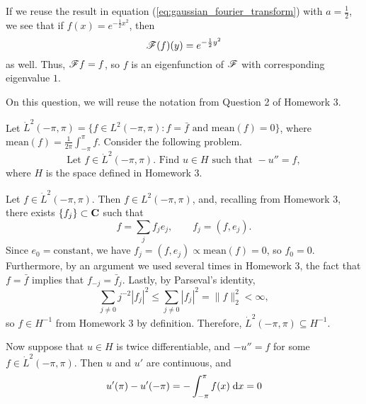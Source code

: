 \documentclass{homework}
\begin{document}
\begin{arabicparts}
		\questionpart If we reuse the result in equation (\ref{eq:gaussian_fourier_transform}) with $a = \frac{1}{2}$, we see that if $f(x) = e^{-\frac{1}{2}x^2}$, then
		\begin{equation}
			\mathscr{F}(f)(y) = e^{-\frac{1}{2}y^2}
		\end{equation}
		as well. Thus, $\mathscr{F} f = f$, so $f$ is an eigenfunction of $\mathscr{F}$ with corresponding eigenvalue $1$.
	\end{arabicparts}
	
	\question
	On this question, we will reuse the notation from Question 2 of Homework 3.
	
	Let $\dot{L}^2(-\pi, \pi) = \{f \in L^2(-\pi, \pi) : f = \bar{f}\text{ and } \mathrm{mean}(f) = 0\}$, where $\mathrm{mean}(f) = \frac{1}{2\pi}\int_{-\pi}^\pi f$. Consider the following problem.
	\begin{equation}
		\text{Let } f\in \dot{L}^2(-\pi,\pi). \text{ Find } u\in H \text{ such that } -u'' = f,
	\end{equation}
	where $H$ is the space defined in Homework 3.
	\begin{arabicparts}
		\questionpart Let $f \in \dot{L}^2(-\pi, \pi)$. Then $f \in L^2(-\pi,\pi)$, and, recalling from Homework 3, there exists $\{f_j\} \subset \textnormal{\bf C}$ such that
		\begin{equation}
			f = \sum_j f_j e_j, \qquad f_j = (f, e_j).
		\end{equation}
		Since $e_0 = \text{constant}$, we have $f_j = (f,e_j) \propto \mathrm{mean}(f) = 0$, so $f_0 = 0$. Furthermore, by an argument we used several times in Homework 3, the fact that $f = \bar{f}$ implies that $f_{-j} = \bar{f}_j$. Lastly, by Parseval's identity,
		\begin{equation}
			\sum_{j\ne 0}j^{-2}|f_j|^2 \le \sum_{j\ne0}|f_j|^2 = \lVert f\rVert_2^2 < \infty,
		\end{equation}
		so $f \in H^{-1}$ from Homework 3 by definition. Therefore, $\dot{L}^2(-\pi,\pi) \subseteq H^{-1}$.
		
		Now suppose that $u \in H$ is twice differentiable, and $-u'' = f$ for some $f \in \dot{L}^2(-\pi,\pi)$. Then $u$ and $u'$ are continuous, and
		\begin{equation}
			u'(\pi) - u'(-\pi) = -\int_{-\pi}^\pi f(x)\;\text{d} x = 0
		\end{equation}
	\end{arabicparts}
\end{document}
